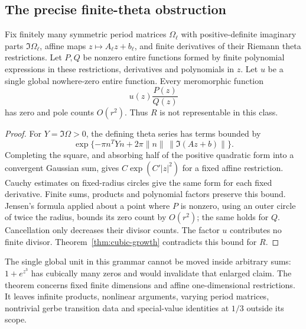 \subsection{The precise finite-theta obstruction}
\begin{theorem}\label{thm:theta-obstruction}
Fix finitely many symmetric period matrices $\Omega_\ell$ with positive-definite imaginary parts $\Im\Omega_\ell$, affine maps $z\mapsto A_\ell z+b_\ell$, and finite derivatives of their Riemann theta restrictions. Let $P,Q$ be nonzero entire functions formed by finite polynomial expressions in these restrictions, derivatives and polynomials in $z$. Let $u$ be a single global nowhere-zero entire function. Every meromorphic function
\[
 u(z)\frac{P(z)}{Q(z)}
\]
has zero and pole counts $O(r^2)$. Thus $R$ is not representable in this class.
\end{theorem}
\begin{proof}
For $Y=\Im\Omega>0$, the defining theta series has terms bounded by
\[
 \exp\{-\pi n^TYn+2\pi\|n\|\,\|\Im(Az+b)\|\}.
\]
Completing the square, and absorbing half of the positive quadratic form into a convergent Gaussian sum, gives $C\exp(C'|z|^2)$ for a fixed affine restriction. Cauchy estimates on fixed-radius circles give the same form for each fixed derivative. Finite sums, products and polynomial factors preserve this bound. Jensen's formula \cite{Jensen} applied about a point where $P$ is nonzero, using an outer circle of twice the radius, bounds its zero count by $O(r^2)$; the same holds for $Q$. Cancellation only decreases their divisor counts. The factor $u$ contributes no finite divisor. Theorem~\ref{thm:cubic-growth} contradicts this bound for $R$.
\end{proof}
The single global unit in this grammar cannot be moved inside arbitrary sums: $1+e^{z^3}$ has cubically many zeros and would invalidate that enlarged claim. The theorem concerns fixed finite dimensions and affine one-dimensional restrictions. It leaves infinite products, nonlinear arguments, varying period matrices, nontrivial gerbe transition data and special-value identities at $1/3$ outside its scope.

